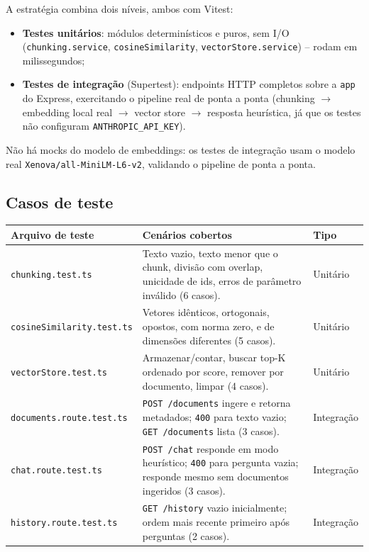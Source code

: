 \documentclass[11pt,a4paper]{article}
\begin{document}
A estratégia combina dois níveis, ambos com Vitest:

\begin{itemize}[leftmargin=1.5cm]
    \item \textbf{Testes unitários}: módulos determinísticos e puros, sem I/O
          (\texttt{chunking.service}, \texttt{cosineSimilarity},
          \texttt{vectorStore.service}) -- rodam em milissegundos;
    \item \textbf{Testes de integração} (Supertest): endpoints HTTP completos
          sobre a \texttt{app} do Express, exercitando o pipeline real de ponta a
          ponta (chunking $\rightarrow$ embedding local real $\rightarrow$ vector
          store $\rightarrow$ resposta heurística, já que os testes não
          configuram \texttt{ANTHROPIC\_API\_KEY}).
\end{itemize}

Não há mocks do modelo de embeddings: os testes de integração usam o modelo real
\texttt{Xenova/all-MiniLM-L6-v2}, validando o pipeline de ponta a ponta.

\subsection{Casos de teste}

\begin{longtable}{p{4.4cm}p{6.8cm}p{2cm}}
\toprule
\textbf{Arquivo de teste} & \textbf{Cenários cobertos} & \textbf{Tipo} \\
\midrule
\endhead
\texttt{chunking.test.ts} & Texto vazio, texto menor que o chunk, divisão com
    overlap, unicidade de ids, erros de parâmetro inválido (6 casos). & Unitário \\
\addlinespace
\texttt{cosineSimilarity.test.ts} & Vetores idênticos, ortogonais, opostos, com
    norma zero, e de dimensões diferentes (5 casos). & Unitário \\
\addlinespace
\texttt{vectorStore.test.ts} & Armazenar/contar, buscar top-K ordenado por score,
    remover por documento, limpar (4 casos). & Unitário \\
\addlinespace
\texttt{documents.route.test.ts} & \texttt{POST /documents} ingere e retorna
    metadados; \texttt{400} para texto vazio; \texttt{GET /documents} lista (3
    casos). & Integração \\
\addlinespace
\texttt{chat.route.test.ts} & \texttt{POST /chat} responde em modo heurístico;
    \texttt{400} para pergunta vazia; responde mesmo sem documentos ingeridos (3
    casos). & Integração \\
\addlinespace
\texttt{history.route.test.ts} & \texttt{GET /history} vazio inicialmente; ordem
    mais recente primeiro após perguntas (2 casos). & Integração \\
\bottomrule
\end{longtable}
\end{document}
